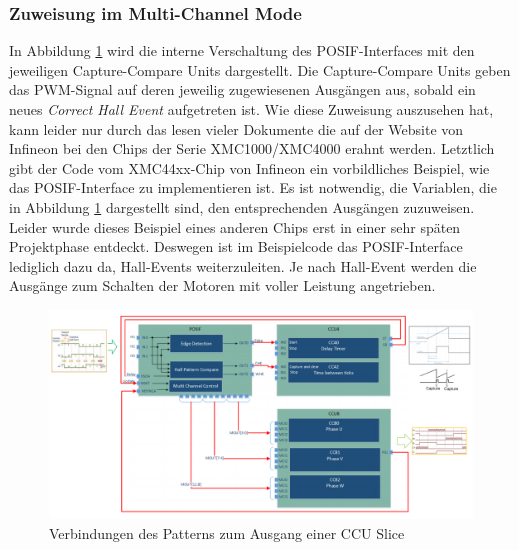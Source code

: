 \subsubsection{Zuweisung im Multi-Channel Mode}
In Abbildung \ref{fig:interconnects} wird die interne Verschaltung des POSIF-Interfaces mit den jeweiligen Capture-Compare Units dargestellt. Die Capture-Compare Units geben das PWM-Signal auf deren jeweilig zugewiesenen Ausgängen aus, sobald ein neues \emph{Correct Hall Event} aufgetreten ist. Wie diese Zuweisung auszusehen hat, kann leider nur durch das lesen vieler Dokumente die auf der Website von Infineon bei den Chips der Serie XMC1000/XMC4000 erahnt werden. Letztlich gibt der Code vom XMC44xx-Chip von Infineon ein vorbildliches Beispiel, wie das POSIF-Interface zu implementieren ist. Es ist notwendig, die Variablen, die in Abbildung \ref{fig:interconnects} dargestellt sind, den entsprechenden Ausgängen zuzuweisen.  Leider wurde dieses Beispiel eines anderen Chips erst in einer sehr späten Projektphase entdeckt. Deswegen ist im Beispielcode das POSIF-Interface lediglich dazu da, Hall-Events weiterzuleiten. Je nach Hall-Event werden die Ausgänge zum Schalten der Motoren mit voller Leistung angetrieben.
\begin{figure}
    \includegraphics[width=\textwidth]{motor/interconnects}
    \caption{Verbindungen des Patterns zum Ausgang einer CCU Slice}
    \label{fig:interconnects}
\end{figure}

